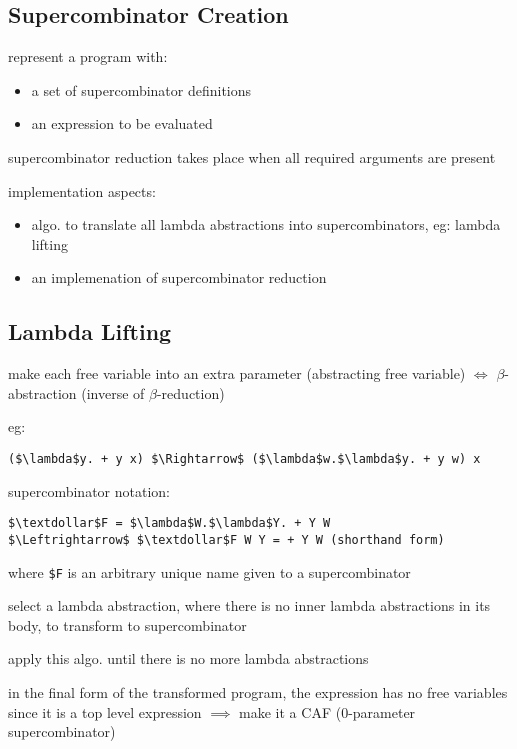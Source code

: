 \documentclass[8pt]{extarticle}
\begin{document}
\begin{multicols*}{2}
\subsection{Supercombinator Creation}

represent a program with:
\begin{itemize}
\item a set of supercombinator definitions
\item an expression to be evaluated
\end{itemize}

supercombinator reduction takes place when all required arguments are present

implementation aspects:
\begin{itemize}
\item algo. to translate all lambda abstractions into supercombinators, eg: lambda lifting
\item an implemenation of supercombinator reduction
\end{itemize}

\subsection{Lambda Lifting}

make each free variable into an extra parameter (abstracting free variable) $\iff$ $\beta$-abstraction (inverse of $\beta$-reduction)

eg:

\begin{lstlisting}
($\lambda$y. + y x) $\Rightarrow$ ($\lambda$w.$\lambda$y. + y w) x
\end{lstlisting}

supercombinator notation:
\begin{lstlisting}
$\textdollar$F = $\lambda$W.$\lambda$Y. + Y W
$\Leftrightarrow$ $\textdollar$F W Y = + Y W (shorthand form)
\end{lstlisting}
where \verb|$F| is an arbitrary unique name given to a supercombinator

select a lambda abstraction, where there is no inner lambda abstractions in its body, to transform to supercombinator

apply this algo. until there is no more lambda abstractions

in the final form of the transformed program, the expression has no free variables since it is a top level expression $\implies$ make it a CAF (0-parameter supercombinator)


\end{multicols*}
\end{document}
